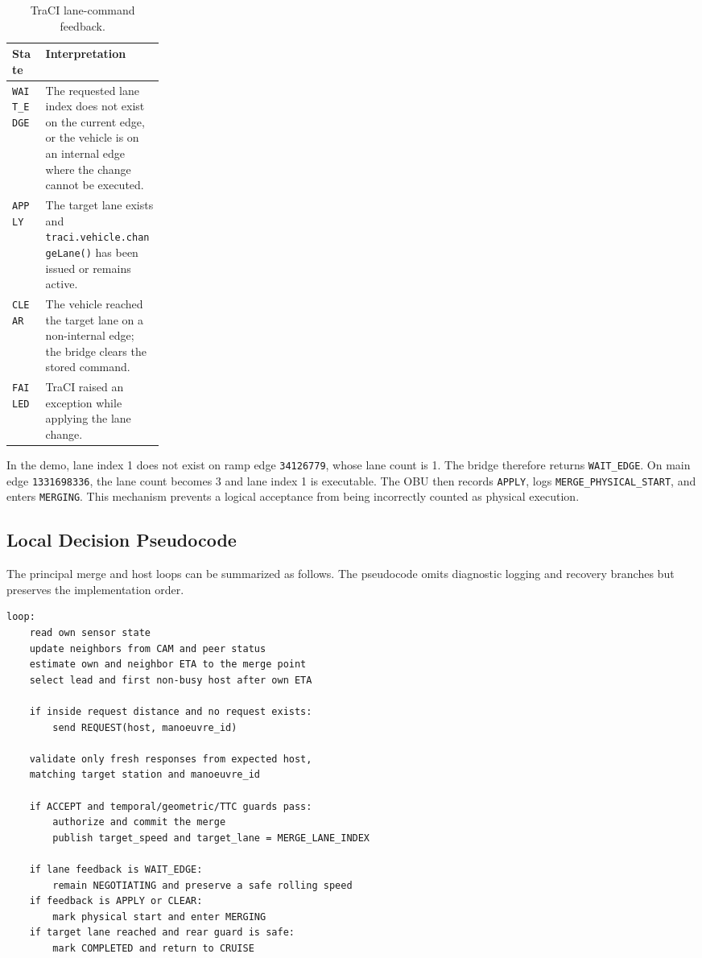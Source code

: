 \documentclass[a4paper,12pt]{article}
\begin{document}
\begin{table}[H]
\centering
\small
\caption{TraCI lane-command feedback.}
\label{tab:lane_states}
\begin{tabularx}{0.92\linewidth}{L{0.22\linewidth} Y}
\toprule
\textbf{State} & \textbf{Interpretation} \\
\midrule
\texttt{WAIT\_EDGE} & The requested lane index does not exist on the current edge, or the vehicle is on an internal edge where the change cannot be executed. \\
\texttt{APPLY} & The target lane exists and \texttt{traci.vehicle.changeLane()} has been issued or remains active. \\
\texttt{CLEAR} & The vehicle reached the target lane on a non-internal edge; the bridge clears the stored command. \\
\texttt{FAILED} & TraCI raised an exception while applying the lane change. \\
\bottomrule
\end{tabularx}
\end{table}

In the demo, lane index 1 does not exist on ramp edge \texttt{34126779}, whose lane count is 1. The bridge therefore returns \texttt{WAIT\_EDGE}. On main edge \texttt{1331698336}, the lane count becomes 3 and lane index 1 is executable. The OBU then records \texttt{APPLY}, logs \texttt{MERGE\_PHYSICAL\_START}, and enters \texttt{MERGING}. This mechanism prevents a logical acceptance from being incorrectly counted as physical execution.

\subsection{Local Decision Pseudocode}

The principal merge and host loops can be summarized as follows. The pseudocode omits diagnostic logging and recovery branches but preserves the implementation order.

\begin{lstlisting}[style=pseudocode,caption={Simplified merge-vehicle decision loop.},label={lst:merge}]
loop:
    read own sensor state
    update neighbors from CAM and peer status
    estimate own and neighbor ETA to the merge point
    select lead and first non-busy host after own ETA

    if inside request distance and no request exists:
        send REQUEST(host, manoeuvre_id)

    validate only fresh responses from expected host,
    matching target station and manoeuvre_id

    if ACCEPT and temporal/geometric/TTC guards pass:
        authorize and commit the merge
        publish target_speed and target_lane = MERGE_LANE_INDEX

    if lane feedback is WAIT_EDGE:
        remain NEGOTIATING and preserve a safe rolling speed
    if feedback is APPLY or CLEAR:
        mark physical start and enter MERGING
    if target lane reached and rear guard is safe:
        mark COMPLETED and return to CRUISE
\end{lstlisting}
\end{document}
